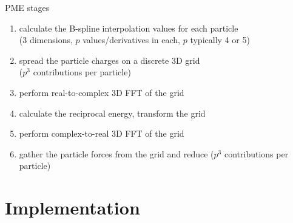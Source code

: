 \documentclass[11pt]{beamer}
\begin{document}
\begin{frame}{PME stages}
\begin{enumerate}
\item calculate the B-spline interpolation values for each particle \\
(3 dimensions, $p$ values/derivatives in each, $p$ typically 4 or 5)
\item spread the particle charges on a discrete 3D grid \\ ($p^3$ contributions per particle)
\item perform real-to-complex 3D FFT of the grid
\item calculate the reciprocal energy, transform the grid
\item perform complex-to-real 3D FFT of the grid
\item gather the particle forces from the grid and reduce ($p^3$ contributions per particle)
\end{enumerate}
\end{frame}


\section{Implementation}

%
\end{document}
